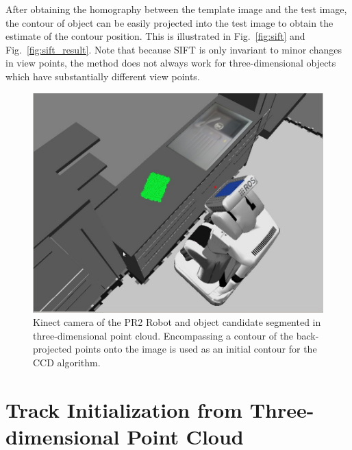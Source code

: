 After obtaining the homography between the template image and the
test image, the contour of object can be easily projected
into the test image to obtain the estimate of the contour
position. This is illustrated in Fig.~\ref{fig:sift} and
Fig.~\ref{fig:sift_result}. Note that because SIFT is only invariant
to minor changes in view points, the method does not always work for
three-dimensional objects which have substantially different view points.



\begin{figure}[htb]
  \centering
  \includegraphics[width=12cm]{images/pr2b.jpg}
  \caption[Kinect camera of the PR2 Robot and object candidate
  segmented in three-dimensional point cloud.]{Kinect camera of
    the PR2 Robot and object candidate segmented in three-dimensional point
    cloud. Encompassing a contour of the back-projected points onto
    the image is used as an initial contour for the CCD algorithm.}
  \label{fig:pointcloud}
\end{figure}
\section{Track Initialization from Three-dimensional Point Cloud}
\label{sec:tifpc}


